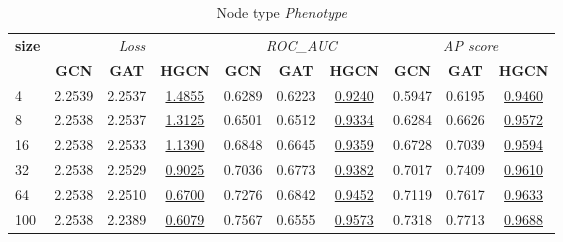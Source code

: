\begin{table}
    \begin{subtable}[t]{\textwidth}
        \centering
        \begin{tabular}{l|ccc|ccc|ccc}   
        \toprule
            \multirow{2}{*}{\textbf{size}} & \multicolumn{3}{c|}{\textit{Loss}} & \multicolumn{3}{c|}{\textit{ROC\_AUC}} & \multicolumn{3}{c}{\textit{AP score}} \\
                & \textbf{GCN} & \textbf{GAT} & \textbf{HGCN} & \textbf{GCN} & \textbf{GAT} & \textbf{HGCN} & \textbf{GCN} & \textbf{GAT} & \textbf{HGCN} \\
            \midrule
            4 & 2.2539 & 2.2537 & \underline{1.4855} & 0.6289 & 0.6223 & \underline{0.9240} & 0.5947 & 0.6195 & \underline{0.9460} \\
            8 & 2.2538 & 2.2537 & \underline{1.3125} & 0.6501 & 0.6512 & \underline{0.9334} & 0.6284 & 0.6626 & \underline{0.9572} \\
            16 & 2.2538 & 2.2533 & \underline{1.1390} & 0.6848 & 0.6645 & \underline{0.9359} & 0.6728 & 0.7039 & \underline{0.9594} \\
            32 & 2.2538 & 2.2529 & \underline{0.9025} & 0.7036 & 0.6773 & \underline{0.9382} & 0.7017 & 0.7409 & \underline{0.9610} \\
            64 & 2.2538 & 2.2510 & \underline{0.6700} & 0.7276 & 0.6842 & \underline{0.9452} & 0.7119 & 0.7617 & \underline{0.9633} \\
            100 & 2.2538 & 2.2389 & \underline{0.6079} & 0.7567 & 0.6555 & \underline{0.9573} & 0.7318 & 0.7713 & \underline{0.9688} \\
            \bottomrule
        \end{tabular}
        \caption{Node type \textit{Phenotype}}
    \end{subtable}
\end{table}
